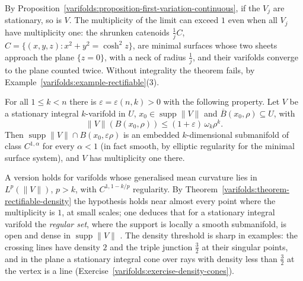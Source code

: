 By Proposition~\ref{varifolds:proposition-first-variation-continuous}, if the $V_j$ are stationary, so is $V$. The multiplicity of the limit can exceed $1$ even when all $V_j$ have multiplicity one: the shrunken
catenoids $\frac1jC$, $C = \{(x, y, z) : x^2 + y^2 = \cosh^2z\}$, are minimal surfaces whose two sheets approach the plane $\{z = 0\}$, with a neck of radius $\frac1j$, and their varifolds converge to the
plane counted twice. Without integrality the theorem fails, by Example~\ref{varifolds:example-rectifiable}(3).

\begin{theorem}\label{varifolds:theorem-allard-regularity}
For all $1 \leq k < n$ there is $\varepsilon = \varepsilon(n, k) > 0$ with the following property. Let $V$ be a stationary integral $k$-varifold in $U$, $x_0 \in \operatorname{supp}\|V\|$ and
$\overline{B}(x_0, \rho) \subseteq U$, with
\[
\|V\|(B(x_0, \rho)) \leq (1 + \varepsilon)\,\omega_k\rho^k .
\]
Then $\operatorname{supp}\|V\| \cap B(x_0, \varepsilon\rho)$ is an embedded $k$-dimensional submanifold of class $C^{1,\alpha}$ for every $\alpha < 1$ (in fact smooth, by elliptic regularity for the minimal surface
system), and $V$ has multiplicity one there.
\end{theorem}

A version holds for varifolds whose generalised mean curvature lies in $L^p(\|V\|)$, $p > k$, with $C^{1, 1 - k/p}$ regularity. By Theorem~\ref{varifolds:theorem-rectifiable-density} the hypothesis holds near
almost every point where the multiplicity is $1$, at small scales; one deduces that for a stationary integral varifold the \emph{regular set}, where the support is locally a smooth submanifold, is open and
dense in $\operatorname{supp}\|V\|$ \cite{allard-1972}. The density threshold is sharp in examples: the crossing lines have density $2$ and the triple junction $\frac32$ at their singular points, and in the
plane a stationary integral cone over rays with density less than $\frac32$ at the vertex is a line (Exercise~\ref{varifolds:exercise-density-cones}).

